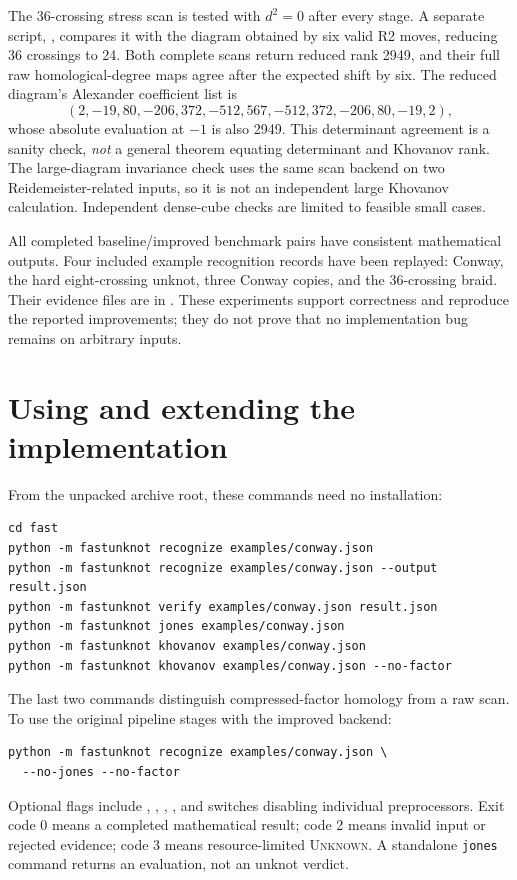 \documentclass[11pt,a4paper]{article}
\theoremstyle{definition}\newtheorem{remark}[theorem]{Remark}
\newcommand{\Unknown}{\textsc{Unknown}}
\begin{document}
The 36-crossing stress scan is tested with $d^2=0$ after every stage. A separate
script, , compares it with the diagram obtained
by six valid R2 moves, reducing 36 crossings to 24. Both complete scans return
reduced rank 2949, and their full raw homological-degree maps agree after the
expected shift by six. The reduced diagram's Alexander coefficient list is
\[
(2,-19,80,-206,372,-512,567,-512,372,-206,80,-19,2),
\]
whose absolute evaluation at $-1$ is also 2949. This determinant agreement is
a sanity check, \emph{not} a general theorem equating determinant and Khovanov
rank. The large-diagram invariance check uses the same scan backend on two
Reidemeister-related inputs, so it is not an independent large Khovanov
calculation. Independent dense-cube checks are limited to feasible small cases.

All completed baseline/improved benchmark pairs have consistent mathematical
outputs. Four included example recognition records have been replayed:
Conway, the hard eight-crossing unknot, three Conway copies, and the 36-crossing
braid. Their evidence files are in . These experiments
support correctness and reproduce the reported improvements; they do not prove
that no implementation bug remains on arbitrary inputs.

\section{Using and extending the implementation}
\label{sec:usage}
From the unpacked archive root, these commands need no installation:
\begin{lstlisting}
cd fast
python -m fastunknot recognize examples/conway.json
python -m fastunknot recognize examples/conway.json --output result.json
python -m fastunknot verify examples/conway.json result.json
python -m fastunknot jones examples/conway.json
python -m fastunknot khovanov examples/conway.json
python -m fastunknot khovanov examples/conway.json --no-factor
\end{lstlisting}
The last two commands distinguish compressed-factor homology from a raw scan.
To use the original pipeline stages with the improved backend:
\begin{lstlisting}
python -m fastunknot recognize examples/conway.json \
  --no-jones --no-factor
\end{lstlisting}
Optional flags include , ,
, , and switches disabling individual
preprocessors. Exit code 0 means a completed mathematical result; code 2 means
invalid input or rejected evidence; code 3 means resource-limited \Unknown.
A standalone \texttt{jones} command returns an evaluation, not an unknot verdict.
\end{document}
